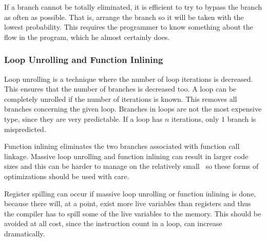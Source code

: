 If a branch cannot be totally eliminated, it is efficient to try to
bypass the branch as often as possible. That is, arrange the branch so
it will be taken with the lowest probability. This requires the
programmer to know something about the flow in the program, which he
almost certainly does.

\subsubsection{Loop Unrolling and Function Inlining}
\label{sec:loopunrolling}

Loop unrolling is a technique where the number of loop iterations is
decreased. This ensures that the number of branches is decreased
too. A loop can be completely unrolled if the number of iterations is
known. This removes all branches concerning the given loop. Branches
in loops are not the most expensive type, since they are very
predictable. If a loop has $n$ iterations, only $1$ branch is
mispredicted.

Function inlining eliminates the two branches associated with function
call linkage. Massive loop unrolling and function inlining can result
in larger code sizes and this can be harder to manage on the
relatively small \LS\, so these forms of optimizations should be used
with care.


Register spilling can occur if massive loop unrolling or function
inlining is done, because there will, at a point, exist more live
variables than registers and thus the compiler has to spill some of
the live variables to the memory. This should be avoided at all cost,
since the instruction count in a loop, can increase dramatically.


%
%

